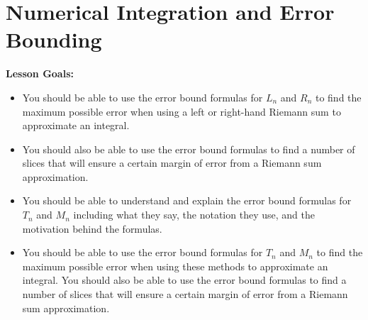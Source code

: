 \documentclass[main]{subfiles}
\begin{document}
\ifSubfilesClassLoaded{%
  \chaptermark{\chapterone}
}{}

\section{Numerical Integration and Error Bounding} \label{ws1-8}
\begin{framed}
\textbf{Lesson Goals:}
\begin{itemize}[parsep=0pt]
\item You should be able to use the error bound formulas for $L_n$ and $R_n$ to find the maximum possible error when using a left or right-hand Riemann sum to approximate an integral. 
\item You should also be able to use the error bound formulas to find a number of slices that will ensure a certain margin of error from a Riemann sum approximation.
\item You should be able to understand and explain the error bound formulas for $T_n$ and $M_n$ including what they say, the notation they use, and the motivation behind the formulas.
\item You should be able to use the error bound formulas for $T_n$ and $M_n$ to find the maximum possible error when using these methods to approximate an integral. You should also be able to use the error bound formulas to find a number of slices that will ensure a certain margin of error from a Riemann sum approximation.
\end{itemize}
\end{framed}


\end{document}
